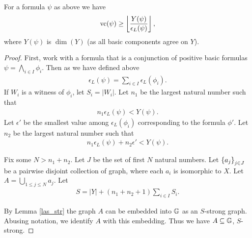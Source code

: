 \begin{Theorem} \label{main_lower}
  For a formula $\psi$ as above we have
  \begin{align*}
    \operatorname{vc} (\psi) \geq \left \lfloor \frac{Y(\psi)}{\epsilon_L(\psi)} \right \rfloor,
  \end{align*}
  where $Y(\psi)$ is $\dim(Y)$ (as all basic components agree on $Y$).
\end{Theorem}
\begin{proof}
  First, work with a formula that is a conjunction of positive basic formulas $\psi = \bigwedge_{i \in I} \phi_i$.
  Then as we have defined above
  \begin{align*}
    \epsilon_L(\psi) = \sum_{i \in I} \epsilon_L(\phi_i).
  \end{align*}
  If $W_i$ is a witness of $\phi_i$, let $S_i = |W_i|$.
  Let $n_1$ be the largest natural number such that
  \begin{align*}
    n_1 \epsilon_L(\psi) < Y(\psi).
  \end{align*}
  Let $\epsilon'$ be the smallest value among $\epsilon_L(\phi_i)$ corresponding to the formula $\phi'$.
  Let $n_2$ be the largest natural number such that
  \begin{align*}
    n_1 \epsilon_L(\psi) + n_2 \epsilon' < Y(\psi).
  \end{align*}

  Fix some $N > n_1 + n_2$.
  Let $J$ be the set of first $N$ natural numbers. 
  Let $\left\{a_j\right\}_{j \in J}$ be a pairwise disjoint collection of graph, where each $a_i$ is isomorphic to $X$.
  Let $A = \bigcup_{1 \leq j \leq N} a_j$.
  Let 
  \begin{align*}
    S = |Y| + (n_1 + n_2 + 1) \sum_{i \in I} S_i.
  \end{align*}

  By Lemma \ref{las_str} the graph $A$ can be embedded into $\mathbb G$ as an $S$-strong graph. 
  Abusing notation, we identify $A$ with this embedding.
  Thus we have $A \subseteq \mathbb G$, $S$-strong. 


\end{proof}
